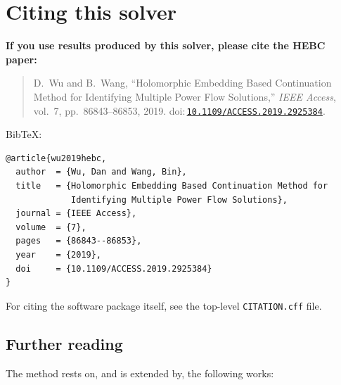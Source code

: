 \documentclass[11pt,a4paper]{article}
\newcommand{\doi}[1]{\href{https://doi.org/#1}{\nolinkurl{#1}}}
\newcommand{\code}[1]{\texttt{#1}}
\begin{document}
\section{Citing this solver}\label{sec:cite}

\textbf{If you use results produced by this solver, please cite the HEBC paper:}
\begin{quote}
D.\ Wu and B.\ Wang, ``Holomorphic Embedding Based Continuation Method for Identifying
Multiple Power Flow Solutions,'' \emph{IEEE Access}, vol.~7, pp.~86843--86853, 2019.
doi:\,\doi{10.1109/ACCESS.2019.2925384}.
\end{quote}

BibTeX:
\begin{lstlisting}[style=sh]
@article{wu2019hebc,
  author  = {Wu, Dan and Wang, Bin},
  title   = {Holomorphic Embedding Based Continuation Method for
             Identifying Multiple Power Flow Solutions},
  journal = {IEEE Access},
  volume  = {7},
  pages   = {86843--86853},
  year    = {2019},
  doi     = {10.1109/ACCESS.2019.2925384}
}
\end{lstlisting}

For citing the software package itself, see the top-level \code{CITATION.cff} file.

\subsection*{Further reading}
The method rests on, and is extended by, the following works:
\end{document}
